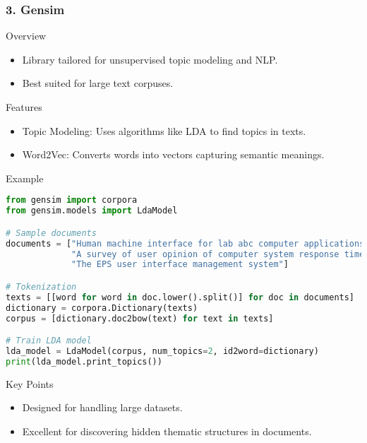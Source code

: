 \documentclass[aspectratio=169]{beamer}
\begin{document}
\begin{frame}[fragile]
    \frametitle{3. Gensim}
    \begin{block}{Overview}
        \begin{itemize}
            \item Library tailored for unsupervised topic modeling and NLP.
            \item Best suited for large text corpuses.
        \end{itemize}
    \end{block}

    \begin{block}{Features}
        \begin{itemize}
            \item Topic Modeling: Uses algorithms like LDA to find topics in texts.
            \item Word2Vec: Converts words into vectors capturing semantic meanings.
        \end{itemize}
    \end{block}

    \begin{block}{Example}
        \begin{lstlisting}[language=Python]
from gensim import corpora
from gensim.models import LdaModel

# Sample documents
documents = ["Human machine interface for lab abc computer applications",
             "A survey of user opinion of computer system response time",
             "The EPS user interface management system"]

# Tokenization
texts = [[word for word in doc.lower().split()] for doc in documents]
dictionary = corpora.Dictionary(texts)
corpus = [dictionary.doc2bow(text) for text in texts]

# Train LDA model
lda_model = LdaModel(corpus, num_topics=2, id2word=dictionary)
print(lda_model.print_topics())
        \end{lstlisting}
    \end{block}

    \begin{block}{Key Points}
        \begin{itemize}
            \item Designed for handling large datasets.
            \item Excellent for discovering hidden thematic structures in documents.
        \end{itemize}
    \end{block}
\end{frame}
\end{document}
